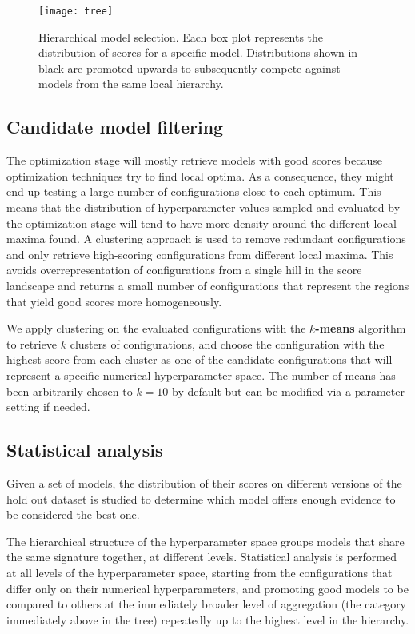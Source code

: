 \begin{figure}[here]
	\texttt{[image: tree]}
	\caption[Hierarchical model selection]{Hierarchical model selection. Each box plot represents
	the distribution of scores for a specific model. Distributions shown in black are promoted
	upwards to subsequently compete against models from the same local hierarchy.}
	\label{img:tree}
\end{figure}

\subsection{Candidate model filtering}
The optimization stage will mostly retrieve models with good scores because optimization
techniques try to find local optima. As a consequence, they might end up testing a large number
of configurations close to each optimum. This means that the distribution of hyperparameter values
sampled and evaluated by the optimization stage will tend to have more density around the different
local maxima found. A clustering approach is used to remove redundant configurations and only retrieve
high-scoring configurations from different local maxima. This avoids overrepresentation of
configurations from a single hill in the score landscape and returns a small number of
configurations that represent the regions that yield good scores more homogeneously.

We apply clustering on the evaluated configurations with the {\bf $k$-means} algorithm to retrieve
$k$ clusters of configurations, and choose the configuration with the highest score from each cluster as
one of the candidate configurations that will represent a specific numerical hyperparameter space.
The number of means has been arbitrarily chosen to $k = 10$ by default but can be modified via a
parameter setting if needed.

\subsection{Statistical analysis}

Given a set of models, the distribution of their scores on different versions of the hold out
dataset is studied to determine which model offers enough evidence to be considered the best one.

The hierarchical structure of the hyperparameter space groups models that share the same signature
together, at different levels. Statistical analysis is performed at all levels of the
hyperparameter space, starting from the configurations that differ only on their numerical
hyperparameters, and promoting good models to be compared to others at the immediately broader
level of aggregation (the category immediately above in the tree) repeatedly up to the highest level
in the hierarchy.

